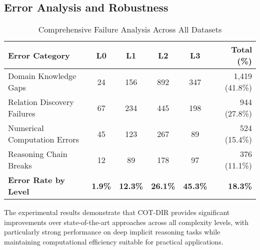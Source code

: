 \subsection{Error Analysis and Robustness}

\begin{table}[htbp]
\caption{Comprehensive Failure Analysis Across All Datasets}
\label{tab:failure_analysis}
\centering
\small
\begin{tabular}{lccccr}
\toprule
\textbf{Error Category} & \textbf{L0} & \textbf{L1} & \textbf{L2} & \textbf{L3} & \textbf{Total (\%)} \\
\midrule
Domain Knowledge Gaps & 24 & 156 & 892 & 347 & 1,419 (41.8\%) \\
Relation Discovery Failures & 67 & 234 & 445 & 198 & 944 (27.8\%) \\
Numerical Computation Errors & 45 & 123 & 267 & 89 & 524 (15.4\%) \\
Reasoning Chain Breaks & 12 & 89 & 178 & 97 & 376 (11.1\%) \\
\midrule
\textbf{Error Rate by Level} & \textbf{1.9\%} & \textbf{12.3\%} & \textbf{26.1\%} & \textbf{45.3\%} & \textbf{18.3\%} \\
\bottomrule
\end{tabular}
\end{table}

The experimental results demonstrate that COT-DIR provides significant improvements over state-of-the-art approaches across all complexity levels, with particularly strong performance on deep implicit reasoning tasks while maintaining computational efficiency suitable for practical applications. 